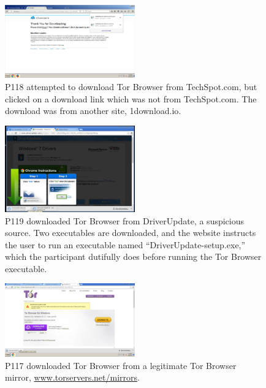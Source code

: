 \documentclass[USenglish,oneside,twocolumn]{article}
\begin{document}
\begin{figure}[h]
\includegraphics[width=0.5\textwidth]{../experiment/processing/bad-participants/X10-20160323-132505-1downloadio.png}
\caption{P118 attempted to download Tor Browser from TechSpot.com, but clicked on
a download link which was not from TechSpot.com. The download was from another site, 1download.io.}
\label{downloadio}
\end{figure} 

\begin{figure}[h]
\includegraphics[width=0.5\textwidth]{../experiment/processing/bad-participants/X28-20160328-134111-driverupdate.png}
\caption{P119 downloaded Tor Browser from DriverUpdate, a suspicious source. Two executables
are downloaded, and the website instructs the user to run an executable named ``DriverUpdate-setup.exe,'' which the
participant dutifully does before running the Tor Browser executable.}
\label{driverupdate}
\end{figure} 

\begin{figure}[h]
\includegraphics[width=0.5\textwidth]{../experiment/processing/bad-participants/X32-20160328-134531-mirror.png}
\caption{P117 downloaded Tor Browser from a legitimate Tor Browser mirror, \url{www.torservers.net/mirrors}.}
\label{mirror}
\end{figure}
\end{document}
